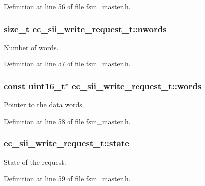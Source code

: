 \-Definition at line 56 of file fsm\-\_\-master.\-h.

\subsubsection[{nwords}]{\setlength{\rightskip}{0pt plus 5cm}size\-\_\-t {\bf ec\-\_\-sii\-\_\-write\-\_\-request\-\_\-t\-::nwords}}\label{structec__sii__write__request__t_a98d3bd46058ea045c94f6f32d0b01d62}


\-Number of words. 



\-Definition at line 57 of file fsm\-\_\-master.\-h.

\subsubsection[{words}]{\setlength{\rightskip}{0pt plus 5cm}const uint16\-\_\-t$\ast$ {\bf ec\-\_\-sii\-\_\-write\-\_\-request\-\_\-t\-::words}}\label{structec__sii__write__request__t_a8a435488d56415ece3c1c531bf9712bf}


\-Pointer to the data words. 



\-Definition at line 58 of file fsm\-\_\-master.\-h.

\subsubsection[{state}]{ {\bf ec\-\_\-sii\-\_\-write\-\_\-request\-\_\-t\-::state}}\label{structec__sii__write__request__t_a4751ad577cec3bff18f540147a8e7ca0}


\-State of the request. 



\-Definition at line 59 of file fsm\-\_\-master.\-h.

